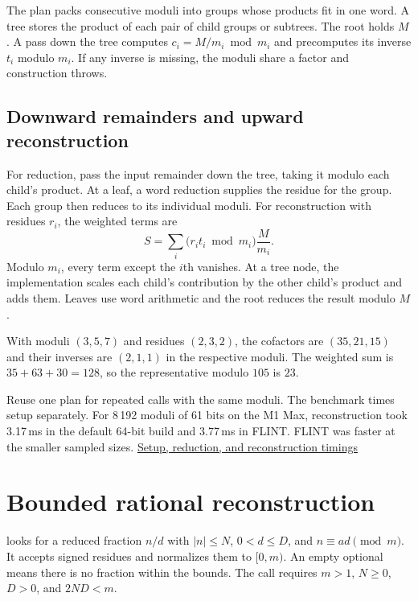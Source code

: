 The plan packs consecutive moduli into groups whose products fit in
one word. A tree stores the product of each pair of child groups or
subtrees. The root holds $M$. A pass down the tree computes
$c_i=M/m_i\bmod m_i$ and precomputes its inverse $t_i$ modulo $m_i$.
If any inverse is missing, the moduli share a factor and construction
throws.

\subsection{Downward remainders and upward reconstruction}

For reduction, pass the input remainder down the tree, taking it
modulo each child's product. At a leaf, a word reduction supplies the
residue for the group. Each group then reduces to its individual
moduli. For reconstruction with residues $r_i$, the weighted terms
are
\[
  S=\sum_i \bigl(r_i t_i\bmod m_i\bigr)\frac{M}{m_i}.
\]
Modulo $m_i$, every term except the $i$th vanishes. At a tree node,
the implementation scales each child's contribution by the other
child's product and adds them. Leaves use word arithmetic and the
root reduces the result modulo $M$.

\begin{example}
With moduli $(3,5,7)$ and residues $(2,3,2)$, the cofactors are
$(35,21,15)$ and their inverses are $(2,1,1)$ in the respective
moduli. The weighted sum is $35+63+30=128$, so the representative
modulo $105$ is $23$.
\end{example}

\begin{practice}
Reuse one plan for repeated calls with the same moduli. The benchmark
times setup separately. For 8\,192 moduli of 61 bits on the M1 Max,
reconstruction took 3.17\,ms in the default 64-bit build and
3.77\,ms in FLINT. FLINT was faster at the smaller sampled sizes.
\href{https://github.com/mmurshed/biginteger/blob/main/BENCHMARK.md\#product-tree-chinese-remaindering}{Setup, reduction, and reconstruction timings}
\end{practice}

\newpage
\section{Bounded rational reconstruction}
\label{sec:rationalreconstruction}

 looks for a reduced fraction
$n/d$ with $|n|\le N$, $0<d\le D$, and $n\equiv ad\pmod m$.
It accepts signed residues and normalizes them to $[0,m)$. An empty
optional means there is no fraction within the bounds. The call
requires $m>1$, $N\ge0$, $D>0$, and $2ND<m$.


